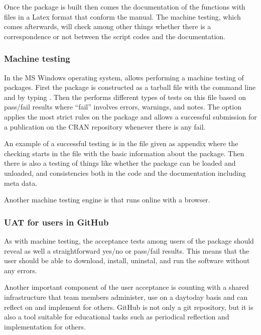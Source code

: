 \documentclass[a4paper,12pt,english]{sphinxhowto}
\begin{document}
Once the package is built then comes the documentation of the functions
with files in a Latex format that conform the manual. The machine
testing, which comes afterwards, will check among other things whether
there is a correspondence or not between the script codes and the
documentation.



\subsubsection{Machine testing}
\label{\detokenize{UAT:machine-testing}}
In the MS Windows operating system, 
allows performing a machine testing of  packages. First the package is constructed as a
tarball file with the command line and by typing . Then the
 performs different types of tests on this file based on pass/fail
results where “fail” involves errors, warnings, and notes. The option
 applies the most strict rules on the package and allows a
successful submission for a publication on the CRAN repository whenever
there is any fail.

An example of a successful testing is in the  file given as
appendix where the checking starts in the  file with the
basic information about the package. Then there is also a testing of
things like whether the package can be loaded and unloaded, and
consistencies both in the code and the documentation including meta
data.

Another machine testing engine is  that runs online with a browser.



\subsubsection{UAT for users in GitHub}
\label{\detokenize{UAT:uat-for-users-in-github}}
As with machine testing, the acceptance tests among users of the
 package should reveal as well a
straightforward yes/no or pass/fail results. This means that the user
should be able to download, install, uninstal, and run the software
without any errors.

Another important component of the user acceptance is counting with a
shared infrastructure that team members administer, use on a day\sphinxhyphen{}to\sphinxhyphen{}day
basis and can reflect on and implement for others. GitHub is not only a
git repository, but it is also a tool suitable for educational tasks
such as periodical reflection and implementation for others.
\end{document}
